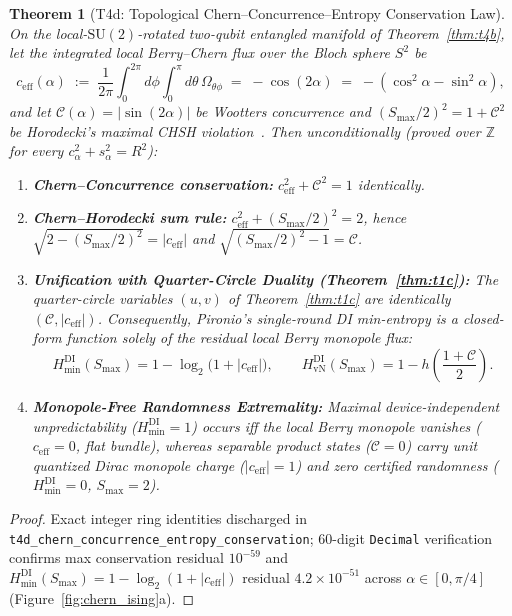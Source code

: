 \documentclass[11pt,reqno]{amsart}
\newtheorem{theorem}{Theorem}[section]
\theoremstyle{definition}
\newcommand{\Z}{\mathbb{Z}}
\newcommand{\Hmin}{H_{\min}^{\mathrm{DI}}}
\newcommand{\HvN}{H_{\mathrm{vN}}^{\mathrm{DI}}}
\newcommand{\Con}{\mathcal{C}}
\newcommand{\code}[1]{\texttt{\small #1}}
\begin{document}
\begin{theorem}[T4d: Topological Chern--Concurrence--Entropy Conservation Law]
\label{thm:t4d}
On the local-$\mathrm{SU}(2)$-rotated two-qubit entangled manifold of Theorem~\ref{thm:t4b}, let the integrated local Berry--Chern flux over the Bloch sphere $S^2$ be
\[
  c_{\mathrm{eff}}(\alpha) \;:=\; \frac{1}{2\pi}\int_0^{2\pi}d\phi\int_0^\pi d\theta\,\Omega_{\theta\phi} \;=\; -\cos(2\alpha) \;=\; -(\cos^2\alpha - \sin^2\alpha),
\]
and let $\Con(\alpha) = |\sin(2\alpha)|$ be Wootters concurrence and $(S_{\max}/2)^2 = 1 + \Con^2$ be Horodecki's maximal CHSH violation~\cite{horodecki1995}. Then unconditionally (proved over $\Z$ for every $c_\alpha^2 + s_\alpha^2 = R^2$):
\begin{enumerate}[leftmargin=1.8em]
  \item \textbf{Chern--Concurrence conservation:} $c_{\mathrm{eff}}^2 + \Con^2 = 1$ identically.
  \item \textbf{Chern--Horodecki sum rule:} $c_{\mathrm{eff}}^2 + (S_{\max}/2)^2 = 2$, hence $\sqrt{2 - (S_{\max}/2)^2} = |c_{\mathrm{eff}}|$ and $\sqrt{(S_{\max}/2)^2 - 1} = \Con$.
  \item \textbf{Unification with Quarter-Circle Duality (Theorem~\ref{thm:t1c}):} The quarter-circle variables $(u, v)$ of Theorem~\ref{thm:t1c} are identically $(\Con, |c_{\mathrm{eff}}|)$. Consequently, Pironio's single-round DI min-entropy is a closed-form function solely of the residual local Berry monopole flux:
  \[
    \Hmin(S_{\max}) = 1 - \log_2\!\bigl(1 + |c_{\mathrm{eff}}|\bigr), \qquad
    \HvN(S_{\max}) = 1 - h\!\left(\frac{1 + \Con}{2}\right).
  \]
  \item \textbf{Monopole-Free Randomness Extremality:} Maximal device-independent unpredictability ($\Hmin = 1$) occurs iff the local Berry monopole vanishes ($c_{\mathrm{eff}} = 0$, flat bundle), whereas separable product states ($\Con = 0$) carry unit quantized Dirac monopole charge ($|c_{\mathrm{eff}}| = 1$) and zero certified randomness ($\Hmin = 0$, $S_{\max} = 2$).
\end{enumerate}
\end{theorem}
\begin{proof}
Exact integer ring identities discharged in \code{t4d\_chern\_concurrence\_entropy\_conservation}; $60$-digit \code{Decimal} verification confirms max conservation residual $10^{-59}$ and $\Hmin(S_{\max}) = 1 - \log_2(1+|c_{\mathrm{eff}}|)$ residual $4.2 \times 10^{-51}$ across $\alpha \in [0,\pi/4]$ (Figure~\ref{fig:chern_ising}a).
\end{proof}
\end{document}
